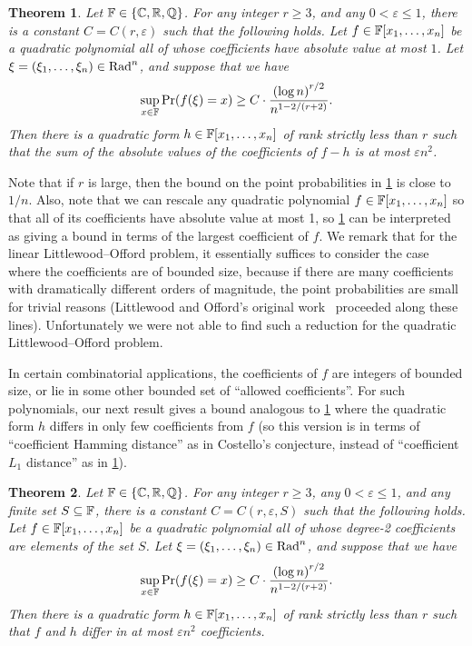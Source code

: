 \documentclass{daj}
\theoremstyle{plain}
\newtheorem{thm}{Theorem}[section]
\theoremstyle{plain}
\theoremstyle{plain}
\theoremstyle{plain}
\theoremstyle{definition}
\theoremstyle{plain}
\theoremstyle{plain}
\theoremstyle{definition}
\theoremstyle{definition}
\theoremstyle{plain}
\let\originalleft\left
\let\originalright\right
\renewcommand{\left}{\mathopen{}\mathclose\bgroup\originalleft}
\renewcommand{\right}{\aftergroup\egroup\originalright}
\begin{document}
\begin{thm}\label{thm:rank-L1}
Let $\mathbb{F}\in \lbrace \mathbb{C},\mathbb{R}, \mathbb{Q}\rbrace$. For any integer $r\geq 3$, and any $0< \varepsilon\leq 1$, there is a constant $C=C(r,\varepsilon)$ such that the following holds. Let $f\in \mathbb{F}[x_1,\dots,x_n]$ be a quadratic polynomial all of whose coefficients have absolute value at most $1$. Let $\xi=(\xi_1,\dots,\xi_n)\in \operatorname{Rad}^n$, and suppose that we have
\[\sup_{x\in \FF}\Pr\left(f(\xi)=x\right)\geq C\cdot \frac{\left(\log n\right)^{r/2}}{n^{1-2/\left(r+2\right)}}.\]
Then there is a quadratic form $h\in\FF\left[x_{1},\dots,x_{n}\right]$
of rank strictly less than $r$ such that the sum of the absolute values of the coefficients of $f-h$ is at most  $\varepsilon n^2$.
\end{thm}

Note that if $r$ is large, then the bound on the point probabilities in \cref{thm:rank-L1} is close to $1/n$. Also, note that we can rescale any quadratic polynomial $f\in \mathbb{F}[x_1,\dots,x_n]$ so that all of its coefficients have absolute value at most 1, so \cref{thm:rank-L1} can be interpreted as giving a bound in terms of the largest coefficient of $f$. We remark that for the linear Littlewood--Offord problem, it essentially suffices to consider the case where the coefficients are
of bounded size, because if there are many coefficients with dramatically
different orders of magnitude, the point probabilities are small for
trivial reasons (Littlewood and Offord's original work~\cite{LO43}
proceeded along these lines). Unfortunately we were not able to find
such a reduction for the quadratic Littlewood--Offord problem.

In certain combinatorial applications, the coefficients of $f$ are integers of bounded size, or lie in some other bounded set of ``allowed coefficients''. For such polynomials, our next result gives a bound analogous to \cref{thm:rank-L1} where the quadratic form $h$ differs in only few coefficients from $f$ (so this version is in terms of ``coefficient Hamming distance'' as in Costello's conjecture, instead of ``coefficient $L_1$ distance'' as in \cref{thm:rank-L1}).

\begin{thm}
\label{thm:rank-edit}Let $\mathbb{F}\in \lbrace \mathbb{C},\mathbb{R}, \mathbb{Q}\rbrace$. For any integer $r\geq 3$, any $0< \varepsilon\leq 1$, and any finite set $S\subseteq \mathbb{F}$, there is a constant $C=C(r,\varepsilon, S)$ such that the following holds. Let $f\in \mathbb{F}[x_1,\dots,x_n]$ be a quadratic polynomial all of whose degree-2 coefficients are elements of the set $S$. Let $\xi=(\xi_1,\dots,\xi_n)\in \operatorname{Rad}^n$, and suppose that we have
\[\sup_{x\in \FF}\Pr\left(f(\xi)=x\right)\geq C\cdot \frac{\left(\log n\right)^{r/2}}{n^{1-2/\left(r+2\right)}}.\]
Then there is a quadratic form $h\in\FF\left[x_{1},\dots,x_{n}\right]$
of rank strictly less than $r$ such that $f$ and $h$ differ in at most $\varepsilon n^2$ coefficients.
\end{thm}
\end{document}
